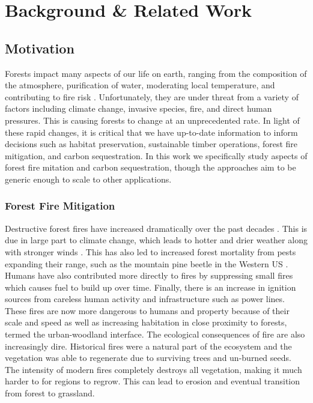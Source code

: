 
\chapter{Background \& Related Work} \label{chapBackground}
\section{Motivation}
Forests impact many aspects of our life on earth, ranging from the composition of the atmosphere, purification of water, moderating local temperature, and contributing to fire risk \cite{IPCC2019ClimateReport}. Unfortunately, they are under threat from a variety of factors including climate change, invasive species, fire, and direct human pressures. This is causing forests to change at an unprecedented rate. In light of these rapid changes, it is critical that we have up-to-date information to inform decisions such as habitat preservation, sustainable timber operations, forest fire mitigation, and carbon sequestration. In this work we specifically study aspects of forest fire mitation and carbon sequestration, though the approaches aim to be generic enough to scale to other applications. 

\subsection{Forest Fire Mitigation} 
Destructive forest fires have increased dramatically over the past decades \cite{spreading_like_wildfire, ayanz2021, nfn2022}. This is due in large part to climate change, which leads to hotter and drier weather along with stronger winds \cite{spreading_like_wildfire}. This has also led to increased forest mortality from pests expanding their range, such as the mountain pine beetle in the Western US \cite{Jenkins2014AndFuels}. Humans have also contributed more directly to fires by suppressing small fires which causes fuel to build up over time. Finally, there is an increase in ignition sources from careless human activity and infrastructure such as power lines. These fires are now more dangerous to humans and property because of their scale and speed as well as increasing habitation in close proximity to forests, termed the urban-woodland interface. The ecological consequences of fire are also increasingly dire. Historical fires were a natural part of the ecosystem and the vegetation was able to regenerate due to surviving trees and un-burned seeds. The intensity of modern fires completely destroys all vegetation, making it much harder to for regions to regrow. This can lead to erosion and eventual transition from forest to grassland.

